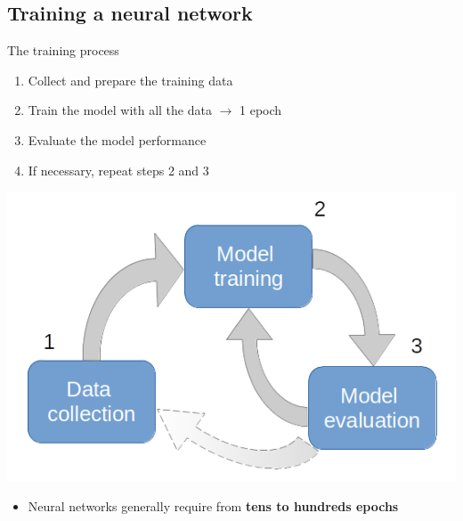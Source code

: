 \documentclass[usenames,dvipsnames]{beamer}
\begin{document}
    \subsection[Training a NN]{Training a neural network }
    \begin{frame}{\secname}{\subsecname}
        The training process
        \begin{enumerate}
            \item Collect and prepare the training data
            \item Train the model with all the data $\rightarrow$ 1 \alert{epoch}
            \item Evaluate the model performance
            \item If necessary, repeat steps 2 and 3
        \end{enumerate}
        \vspace{-0.7em}
        \begin{center}
            \includegraphics[width=0.45\linewidth]{figures/DL_fundamentals/DL_training_process_epoch.png}
        \end{center}
        \vspace{-0.7em}
        \begin{itemize}
            \item Neural networks generally require from \textbf{tens to hundreds epochs}
        \end{itemize}
    \end{frame}
\end{document}
